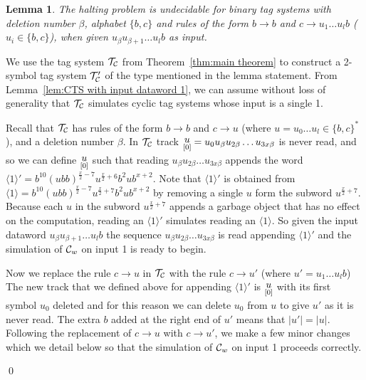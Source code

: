\documentclass[11pt]{article} \usepackage{amsfonts,amsmath,amssymb,amsthm}
\renewenvironment{proof}{{\bfseries\noindent Proof.}}{\qed\vspace{3.5ex}}
\newtheorem{lemma}{Lemma}
\newcommand{\tne}[1]{\ensuremath{\langle #1\rangle}}
\newcommand{\encodeOne}{\tne{1}}
\newcommand{\encodeOneSequence}{\ensuremath{b^{10}(ubb)^{\frac{x}{2}-7}u^{\frac{x}{2}+7}b^{2}ub^{x+2}}}
\newcommand{\track}[2]{\raisebox{2.5pt}{\ensuremath{\underset{[#1]}#2}}}
\begin{document}
\begin{lemma}\label{lem:binary tag system for PCP}
The halting problem is undecidable for binary tag systems with deletion number $\beta$, alphabet $\{b,c\}$ and rules of the form $b\rightarrow b$ and $c\rightarrow u_1\ldots u_lb$ ($u_i\in\{b,c\}$), when given $u_{\beta}u_{\beta+1}\ldots u_lb$ as input.
\end{lemma}
\begin{proof}
We use the tag system $\mathcal{T_{\mathcal{C}}}$ from Theorem~\ref{thm:main theorem} to construct a 2-symbol tag system $\mathcal{T'_{\mathcal{C}}}$ of the type mentioned in the lemma statement. From Lemma~\ref{lem:CTS with input dataword 1}, we can assume without loss of generality that $\mathcal{T_{\mathcal{C}}}$ simulates cyclic tag systems whose input is a single 1.

Recall that $\mathcal{T_{\mathcal{C}}}$ has rules of the form $b\rightarrow b$ and $c\rightarrow u$ (where $u=u_0\ldots u_l\in\{b,c\}^\ast$), and a deletion number $\beta$. 
In $\mathcal{T_{\mathcal{C}}}$ track $\track{0}{u}=u_{0}u_{\beta}u_{2\beta}\ldots u_{3x\beta}$ is never read, and so we can define $\track{0}{u}$ such that reading $u_{\beta}u_{2\beta}\ldots u_{3x\beta}$ appends the word $\encodeOne'=b^{10}(ubb)^{\frac{x}{2}-7}u^{\frac{x}{2}+6}b^{2}ub^{x+2}$. 
Note that $\encodeOne'$ is obtained from $\encodeOne=\encodeOneSequence$ by removing a single $u$ form the subword $u^{\frac{x}{2}+7}$. 
Because each $u$ in the subword $u^{\frac{x}{2}+7}$ appends a garbage object that has no effect on the computation, reading an $\encodeOne'$ simulates reading an $\encodeOne$. 
So given the input dataword $u_{\beta}u_{\beta+1}\ldots u_lb$ the sequence $u_{\beta}u_{2\beta}\ldots u_{3x\beta}$ is read appending $\encodeOne'$ and the simulation of $\mathcal{C}_w$ on input 1 is ready to begin.

Now we replace the rule $c\rightarrow u$ in $\mathcal{T_{\mathcal{C}}}$ with the rule $c\rightarrow u'$ (where $u'=u_1\ldots u_lb$)
The new track that we defined above for appending $\encodeOne'$ is $\track{0}{u}$ with its first symbol $u_{0}$ deleted and for this reason we can delete $u_0$ from $u$ to give $u'$ as it is never read.
The extra $b$ added at the right end of $u'$ means that $|u'|=|u|$. 
Following the replacement of $c\rightarrow u$ with $c\rightarrow u'$, we make a few minor changes which we detail below so that the simulation of $\mathcal{C}_w$ on input 1 proceeds correctly.



\end{proof}
\end{document}
